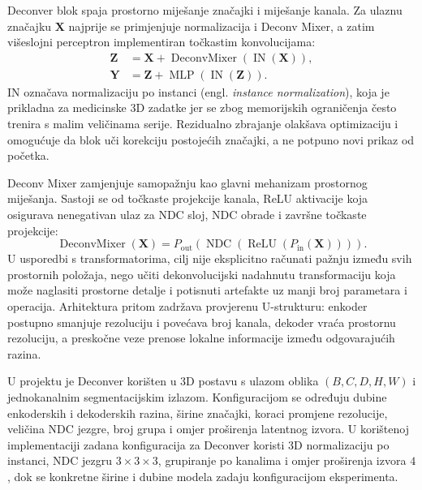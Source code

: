 \documentclass[a4paper,12pt,oneside]{article}
\begin{document}
Deconver blok spaja prostorno miješanje značajki i miješanje kanala. Za ulaznu značajku $\mathbf{X}$ najprije se primjenjuje normalizacija i Deconv Mixer, a zatim višeslojni perceptron implementiran točkastim konvolucijama:
\begin{align}
\mathbf{Z} &= \mathbf{X} + \operatorname{DeconvMixer}(\operatorname{IN}(\mathbf{X})), \label{eq:deconver_block_mixer}\\
\mathbf{Y} &= \mathbf{Z} + \operatorname{MLP}(\operatorname{IN}(\mathbf{Z})). \label{eq:deconver_block_mlp}
\end{align}
IN označava normalizaciju po instanci (engl. \textit{instance normalization}), koja je prikladna za medicinske 3D zadatke jer se zbog memorijskih ograničenja često trenira s malim veličinama serije. Rezidualno zbrajanje olakšava optimizaciju i omogućuje da blok uči korekciju postojećih značajki, a ne potpuno novi prikaz od početka.

Deconv Mixer zamjenjuje samopažnju kao glavni mehanizam prostornog miješanja. Sastoji se od točkaste projekcije kanala, ReLU aktivacije koja osigurava nenegativan ulaz za NDC sloj, NDC obrade i završne točkaste projekcije:
\begin{equation}\label{eq:deconver_mixer}
\operatorname{DeconvMixer}(\mathbf{X}) =
P_{\mathrm{out}}\left(\operatorname{NDC}\left(\operatorname{ReLU}\left(P_{\mathrm{in}}(\mathbf{X})\right)\right)\right).
\end{equation}
U usporedbi s transformatorima, cilj nije eksplicitno računati pažnju između svih prostornih položaja, nego učiti dekonvolucijski nadahnutu transformaciju koja može naglasiti prostorne detalje i potisnuti artefakte uz manji broj parametara i operacija. Arhitektura pritom zadržava provjerenu U-strukturu: enkoder postupno smanjuje rezoluciju i povećava broj kanala, dekoder vraća prostornu rezoluciju, a preskočne veze prenose lokalne informacije između odgovarajućih razina.

U projektu je Deconver korišten u 3D postavu s ulazom oblika $(B, C, D, H, W)$ i jednokanalnim segmentacijskim izlazom. Konfiguracijom se određuju dubine enkoderskih i dekoderskih razina, širine značajki, koraci promjene rezolucije, veličina NDC jezgre, broj grupa i omjer proširenja latentnog izvora. U korištenoj implementaciji zadana konfiguracija za Deconver koristi 3D normalizaciju po instanci, NDC jezgru $3 \times 3 \times 3$, grupiranje po kanalima i omjer proširenja izvora $4$, dok se konkretne širine i dubine modela zadaju konfiguracijom eksperimenta.
\end{document}
